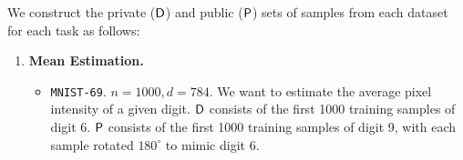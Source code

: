 We construct the private (${\mathsf{D}}$) and public (${\mathsf{P}}$) sets of samples from each dataset for each task as follows:
\begin{enumerate}[itemsep=0mm]
        \item \textbf{Mean Estimation.}
        \begin{itemize}
            \item \texttt{MNIST-69}. 
            $n = 1000, d = 784$. We want to estimate the average pixel intensity of a given digit.
            ${\mathsf{D}}$ consists of the first 1000 training samples of digit 6. ${\mathsf{P}}$ consists of the first 1000 training samples of digit 9, with each sample rotated $180^{\circ}$ to mimic digit 6.
        \end{itemize}


\end{enumerate}
